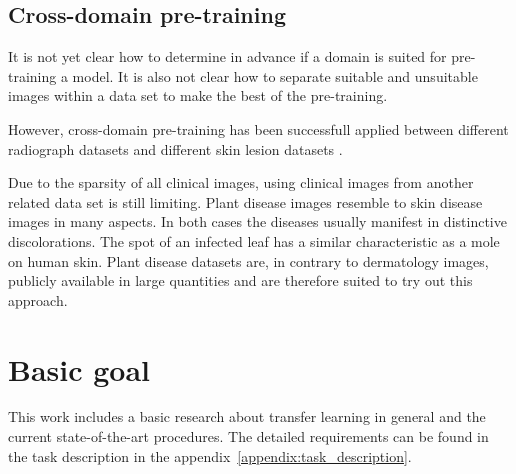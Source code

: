 \subsection{Cross-domain pre-training}
It is not yet clear how to determine in advance if a domain is suited for pre-training a model. 
It is also not clear how to separate suitable and unsuitable images within a data set to make the best of the pre-training.

However, cross-domain pre-training has been successfull applied between different radiograph datasets \autocite{cohen2020} and different skin lesion datasets \autocite{krammer2022}.

Due to the sparsity of all clinical images, using clinical images from another related data set is still limiting.
Plant disease images resemble to skin disease images in many aspects. 
In both cases the diseases usually manifest in distinctive discolorations. %
The spot of an infected leaf has a similar characteristic as a mole on human skin.
Plant disease datasets are, in contrary to dermatology images, publicly available in large quantities and are therefore suited to try out this approach.


\section{Basic goal}
This work includes a basic research about transfer learning in general and the current state-of-the-art procedures. 
The detailed requirements can be found in the task description in the appendix~\ref{appendix:task_description}.



